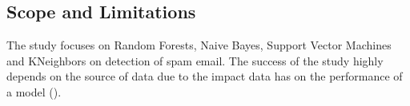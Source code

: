 \subsection{Scope and Limitations}
The study focuses on Random Forests, Naive Bayes, Support Vector Machines and KNeighbors on detection of spam email. The success of the study highly depends on the source of data due to the impact data has on the performance of a model (\cite{ragab_sharkas_marshall_ren_2019}).
